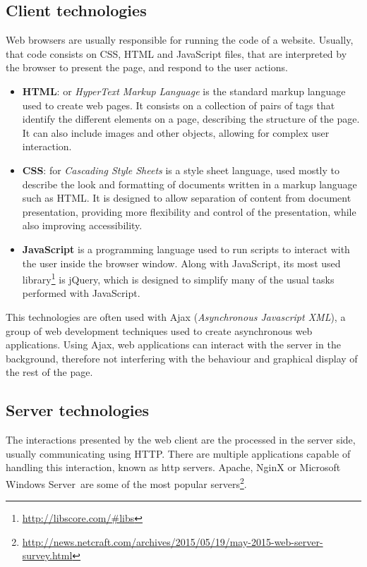 \subsection{Client technologies}

Web browsers are usually responsible for running the code of a website. Usually, that code consists on CSS, HTML and JavaScript files, that are interpreted by the browser to present the page, and respond to the user actions.

\begin{itemize}
 \item \textbf{HTML}: or \emph{HyperText Markup Language} is the standard markup language used to create web pages. It consists on a collection of pairs of tags that identify the different elements on a page, describing the structure of the page. It can also include images and other objects, allowing for complex user interaction.
\item \textbf{CSS}: for \emph{Cascading Style Sheets} is a style sheet language, used mostly to describe the look and formatting of documents written in a markup language such as HTML. It is designed to allow separation of content from document presentation, providing more flexibility and control of the presentation, while also improving accessibility.
 \item \textbf{JavaScript} is a programming language used to run scripts to interact with the user inside the browser window. Along with JavaScript, its most used library\footnote{\url{http://libscore.com/\#libs}} is jQuery, which is designed to simplify many of the usual tasks performed with JavaScript.
\end{itemize}

This technologies are often used with Ajax (\emph{Asynchronous Javascript XML}), a group of web development techniques used to create asynchronous web applications. Using Ajax, web applications can interact with the server in the background, therefore not interfering with the behaviour and graphical display of the rest of the page.


\subsection{Server technologies}


The interactions presented by the web client are the processed in the server side, usually communicating using HTTP. There are multiple applications capable of handling this interaction, known as http servers. Apache, NginX or Microsoft Windows Server\textregistered~are some of the most popular servers\footnote{\url{http://news.netcraft.com/archives/2015/05/19/may-2015-web-server-survey.html}}. 

